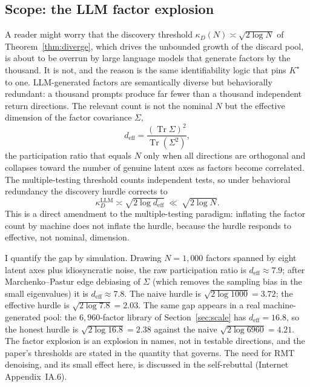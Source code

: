 \documentclass[12pt]{article}
\theoremstyle{plain}
\theoremstyle{definition}
\begin{document}
\subsection{Scope: the LLM factor explosion}
\label{sec:kstar-llm}

A reader might worry that the discovery threshold $\kappa_D(N)\asymp\sqrt{2\log
N}$ of Theorem~\ref{thm:diverge}, which drives the unbounded growth of the
discard pool, is about to be overrun by large language models that generate
factors by the thousand. It is not, and the reason is the same identifiability
logic that pins $K^\star$ to one. LLM-generated factors are semantically diverse
but behaviorally redundant: a thousand prompts produce far fewer than a thousand
independent return directions. The relevant count is not the nominal $N$ but the
effective dimension of the factor covariance $\Sigma$,
\begin{equation}
\label{eq:deff}
d_{\text{eff}}=\frac{(\operatorname{Tr}\Sigma)^2}{\operatorname{Tr}(\Sigma^2)},
\end{equation}
the participation ratio that equals $N$ only when all directions are orthogonal
and collapses toward the number of genuine latent axes as factors become
correlated. The multiple-testing threshold counts independent tests, so under
behavioral redundancy the discovery hurdle corrects to
\[
\kappa_D^{\text{LLM}}\asymp\sqrt{2\log d_{\text{eff}}}\ \ll\ \sqrt{2\log N}.
\]
This is a direct amendment to the \citet{HarveyLiuZhu2016} multiple-testing
paradigm: inflating the factor count by machine does not inflate the hurdle,
because the hurdle responds to effective, not nominal, dimension.

I quantify the gap by simulation. Drawing $N=1{,}000$ factors spanned by eight
latent axes plus idiosyncratic noise, the raw participation ratio is
$d_{\text{eff}}\approx 7.9$; after Marchenko--Pastur edge debiasing of $\Sigma$
(which removes the sampling bias in the small eigenvalues) it is
$d_{\text{eff}}\approx 7.8$. The naive hurdle is $\sqrt{2\log 1000}=3.72$; the
effective hurdle is $\sqrt{2\log 7.8}=2.03$. The same gap appears in a real
machine-generated pool: the $6{,}960$-factor library of
Section~\ref{sec:scale} has $d_{\text{eff}}=16.8$, so the honest hurdle is
$\sqrt{2\log 16.8}=2.38$ against the naive $\sqrt{2\log 6960}=4.21$. The factor
explosion is an explosion in names, not in testable directions, and the paper's
thresholds are stated in the quantity that governs. The need for RMT denoising,
and its small effect here, is discussed in the self-rebuttal (Internet
Appendix~IA.6).
\end{document}
